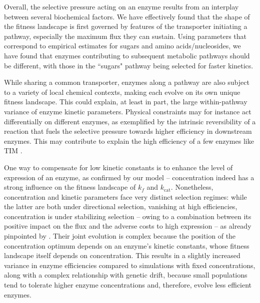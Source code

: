 \documentclass[nogrid,crop,final]{MBE2}%
\begin{document}
Overall, the selective pressure acting on an enzyme results from an interplay between several biochemical factors. We have effectively found that the shape of the fitness landscape is first governed by features of the transporter initiating a pathway, especially the maximum flux they can sustain. Using parameters that correspond to empirical estimates for sugars and amino acids/nucleosides, we have found that enzymes contributing to subsequent metabolic pathways should be different, with those in the ``sugars" pathway being selected for faster kinetics.

While sharing a common transporter, enzymes along a pathway are also subject to a variety of local chemical contexts, making each evolve on its own unique fitness landscape. This could explain, at least in part, the large within-pathway variance of enzyme kinetic parameters. Physical constraints may for instance act differentially on different enzymes, as exemplified by the intrinsic reversibility of a reaction that fuels the selective pressure towards higher efficiency in downstream enzymes. This may contribute to explain the high efficiency of a few enzymes like TIM %
\citep{Williamson67,Davidi18}.

One way to compensate for low kinetic constants is to enhance the level of expression of an enzyme, as confirmed by our model -- concentration indeed has a strong influence on the fitness landscape of $k_f$ and $k_\text{cat}$. Nonetheless, concentration and kinetic parameters face very distinct selection regimes: while the latter are both under directional selection, vanishing at high efficiencies, concentration is under stabilizing selection -- owing to a combination between its positive impact on the flux and the adverse costs to high expression -- as already pinpointed by \citet{Chou14}. Their joint evolution is complex because the position of the concentration optimum depends on an enzyme's kinetic constants, whose fitness landscape itself depends on concentration. This results in a slightly increased variance in enzyme efficiencies compared to simulations with fixed concentrations, along with a complex relationship with genetic drift, because small populations tend to tolerate higher enzyme concentrations and, therefore, evolve less efficient enzymes.
\end{document}
